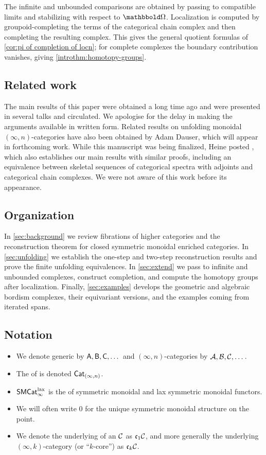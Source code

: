 \documentclass[a4paper,11pt]{article}
\begin{document}
The infinite and unbounded comparisons are obtained by passing to
compatible limits and stabilizing with respect to $\mOm$.
Localization is computed by groupoid-completing the terms of the
categorical chain complex and then completing the resulting complex.
This gives the general quotient formulas of
\cref{cor:pi of completion of locn}; for complete complexes the
boundary contribution vanishes, giving
\cref{introthm:homotopy-groups}.

\subsection*{Related work}
The main results of this paper were obtained a long 
time ago and were presented in several talks and circulated. We
apologise for the delay in making the arguments available in written
form. Related results on unfolding monoidal
$(\infty,n)$-categories have also been obtained by Adam Dauser, which will appear  in forthcoming work. 
While this manuscript
was being finalized, Heine posted
\cite{HeineAdjoints}, which also establishes our main results with
similar proofs, including an equivalence between skeletal sequences
of categorical spectra with adjoints and categorical chain
complexes. We were not aware of this work before its appearance.

\subsection*{Organization}

In \cref{sec:background} we review fibrations of higher categories
and the reconstruction theorem for closed symmetric monoidal
enriched categories.  In \cref{sec:unfolding} we establish the
one-step and two-step reconstruction results and prove the finite
unfolding equivalences.  In \cref{sec:extend} we pass to infinite and
unbounded complexes, construct completion, and compute the homotopy
groups after localization.  Finally, \cref{sec:examples} develops
the geometric and algebraic bordism complexes, their equivariant
versions, and the examples coming from iterated spans.

\subsection*{Notation}

\begin{itemize}
\item We denote generic \icats{} by $\oA, \oB, \oC, \dots$ and
  $(\infty,n)$-categories by $\nA, \nB, \nC, \dots$.
\item The \icat{} of \incats{} is denoted
  $\CatIn$.
\item $\SMCatIl$ is the \icat{} of symmetric
  monoidal \icats{} and lax symmetric monoidal functors.
\item We will often write $0$ for the unique symmetric monoidal
  structure on the point.
\item We denote the underlying \icat{} of an \incat{} $\nC$ as $\core
  \nC$, and more generally the underlying $(\infty,k)$-category (or ``$k$-core'') as
  $\core[k] \nC$.
\end{itemize}
\end{document}
